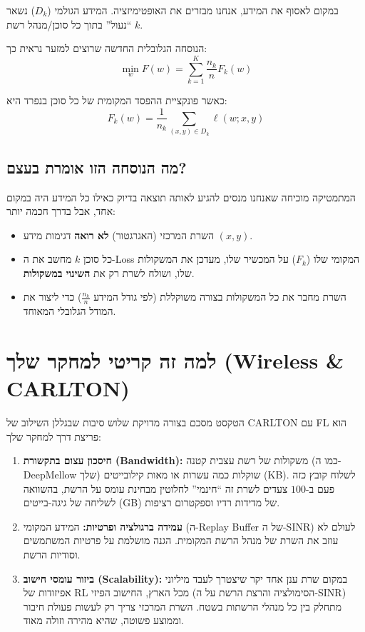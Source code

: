 \documentclass[11pt,a4paper]{article}
\newcommand{\loss}{\ell}
\begin{document}
במקום לאסוף את המידע, אנחנו מבזרים את האופטימיזציה.
המידע הגולמי ($D_k$) נשאר ``נעול'' בתוך כל סוכן/מנהל רשת $k$.

הנוסחה הגלובלית החדשה שרוצים למזער נראית כך:
\begin{equation}
  \min_{w} F(w) = \sum_{k=1}^{K} \frac{n_k}{n} F_k(w)
  \label{eq:global-fl}
\end{equation}

כאשר פונקציית ההפסד המקומית של כל סוכן בנפרד היא:
\begin{equation}
  F_k(w) = \frac{1}{n_k} \sum_{(x,y) \in D_k} \loss(w; x, y)
  \label{eq:local-loss}
\end{equation}

\subsection{מה הנוסחה הזו אומרת בעצם?}

המתמטיקה מוכיחה שאנחנו מנסים להגיע לאותה תוצאה בדיוק כאילו כל המידע היה במקום אחד, אבל בדרך חכמה יותר:

\begin{itemize}
  \item השרת המרכזי (האגרגטור) \textbf{לא רואה} דגימות מידע $(x, y)$.
  \item כל סוכן $k$ מחשב את ה-Loss המקומי שלו ($F_k$) על המכשיר שלו, מעדכן את המשקולות שלו, ושולח לשרת רק את \textbf{השינוי במשקולות}.
  \item השרת מחבר את כל המשקולות בצורה משוקללת (לפי גודל המידע $\frac{n_k}{n}$) כדי ליצור את המודל הגלובלי המאוחד.
\end{itemize}

\section{למה זה קריטי למחקר שלך (Wireless \& CARLTON)}

הטקסט מסכם בצורה מדויקת שלוש סיבות שבגללן השילוב של CARLTON עם FL הוא פריצת דרך למחקר שלך:

\begin{enumerate}
  \item \textbf{חיסכון עצום בתקשורת (Bandwidth):}
    משקולות של רשת עצבית קטנה (כמו ה-DeepMellow שלך) שוקלות כמה עשרות או מאות קילובייטים (KB).
    לשלוח קובץ כזה פעם ב-$100$ צעדים לשרת זה ``חינמי'' לחלוטין מבחינת עומס על הרשת, בהשוואה לשליחה של גיגה-בייטים (GB) של מדידות רדיו וספקטרום רציפות.

  \item \textbf{עמידה ברגולציה ופרטיות:}
    המידע המקומי (ה-Replay Buffer של ה-SINR) לעולם לא עוזב את השרת של מנהל הרשת המקומית.
    הגנה מושלמת על פרטיות המשתמשים וסודיות הרשת.

  \item \textbf{ביזור עומסי חישוב (Scalability):}
    במקום שרת ענן אחד יקר שיצטרך לעבד מיליוני אפיזודות של RL מכל הארץ, החישוב הפיזי (הסימולציה והרצת הרשת על ה-SINR) מתחלק בין כל מנהלי הרשתות בשטח.
    השרת המרכזי צריך רק לעשות פעולת חיבור וממוצע פשוטה, שהיא מהירה וזולה מאוד.
\end{enumerate}
\end{document}

